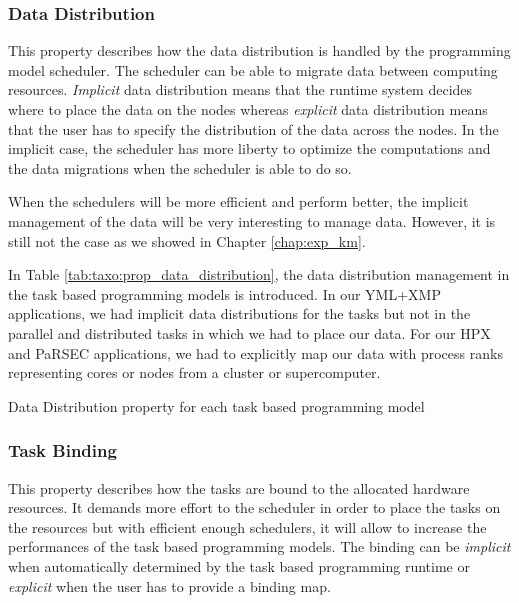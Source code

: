 \subsubsection{Data Distribution}
This property describes how the data distribution is handled by the programming model scheduler.
The scheduler can be able to migrate data between computing resources.
\textit{Implicit} data distribution means that the runtime system decides where to place the data on the nodes whereas \textit{explicit} data distribution means that the user has to specify the distribution of the data across the nodes.
In the implicit case, the scheduler has more liberty to optimize the computations and the data migrations when the scheduler is able to do so.

When the schedulers will be more efficient and perform better, the implicit management of the data will be very interesting to manage data.
However, it is still not the case as we showed in Chapter \ref{chap:exp_km}.

In Table \ref{tab:taxo:prop_data_distribution}, the data distribution management in the task based programming models is introduced.
In our YML+XMP applications, we had implicit data distributions for the tasks but not in the parallel and distributed tasks in which we had to place our data.
For our HPX and PaRSEC applications, we had to explicitly map our data with process ranks representing cores or nodes from a cluster or supercomputer.

\begin{table}[H]
	\caption{Data Distribution property for each task based programming model \label{tab:taxo:prop_data_distribution}}
	\centering
	\begin{multicols}{2}
		

		
	\end{multicols}
\end{table}

\subsubsection{Task Binding}
This property describes how the tasks are bound to the allocated hardware resources.
It demands more effort to the scheduler in order to place the tasks on the resources but with efficient enough schedulers, it will allow to increase the performances of the task based programming models.
The binding can be \textit{implicit} when automatically determined by the task based programming runtime or \textit{explicit} when the user has to provide a binding map.


